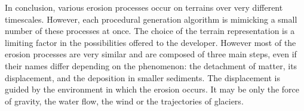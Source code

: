 \midConclusion

In conclusion, various erosion processes occur on terrains over very different timescales. However, each procedural generation algorithm is mimicking a small number of these processes at once. The choice of the terrain representation is a limiting factor in the possibilities offered to the developer. However most of the erosion processes are very similar and are composed of three main steps, even if their names differ depending on the phenomenon: the detachment of matter, its displacement, and the deposition in smaller sediments. The displacement is guided by the environment in which the erosion occurs. It may be only the force of gravity, the water flow, the wind or the trajectories of glaciers.
